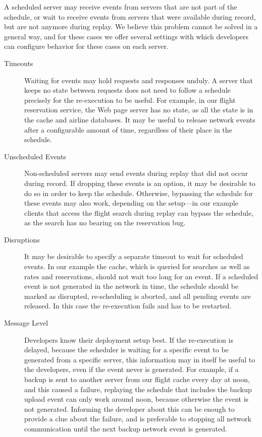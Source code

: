 A scheduled server may receive events from servers that are not part
of the schedule, or wait to receive events from servers that were
available during record, but are not anymore during replay. We believe
this problem cannot be solved in a general way, and for these cases we
offer several settings with which developers can configure behavior
for these cases on each server.

\begin{description}
\item[Timeouts] Waiting for events may hold requests and responses
  unduly. A server that keeps no state between requests does not need
  to follow a schedule precisely for the re-execution to be
  useful. For example, in our flight reservation service, the Web page
  server has no state, as all the state is in the cache and airline
  databases. It may be useful to release network events after a
  configurable amount of time, regardless of their place in the
  schedule.
\item[Unscheduled Events] Non-scheduled servers may send events during
  replay that did not occur during record. If dropping these events is
  an option, it may be desirable to do so in order to keep the
  schedule. Otherwise, bypassing the schedule for these events may
  also work, depending on the setup---in our example clients that
  access the flight search during replay can bypass the schedule, as
  the search has no bearing on the reservation bug.
\item[Disruptions] It may be desirable to specify a separate timeout
  to wait for scheduled events. In our example the cache, which is
  queried for searches as well as rates and reservations, should not
  wait too long for an event. If a scheduled event is not generated in
  the network in time, the schedule should be marked as disrupted,
  re-scheduling is aborted, and all pending events are released. In
  this case the re-execution fails and has to be restarted.
\item[Message Level] Developers know their deployment setup best. If
  the re-execution is delayed, because the scheduler is waiting for a
  specific event to be generated from a specific server, this
  information may in itself be useful to the developers, even if the
  event never is generated. For example, if a backup is sent to
  another server from our flight cache every day at noon, and this
  caused a failure, replaying the schedule that includes the backup
  upload event can only work around noon, because otherwise the event
  is not generated. Informing the developer about this can be enough
  to provide a clue about the failure, and is preferable to stopping
  all network communication until the next backup network event is
  generated.
\end{description}

